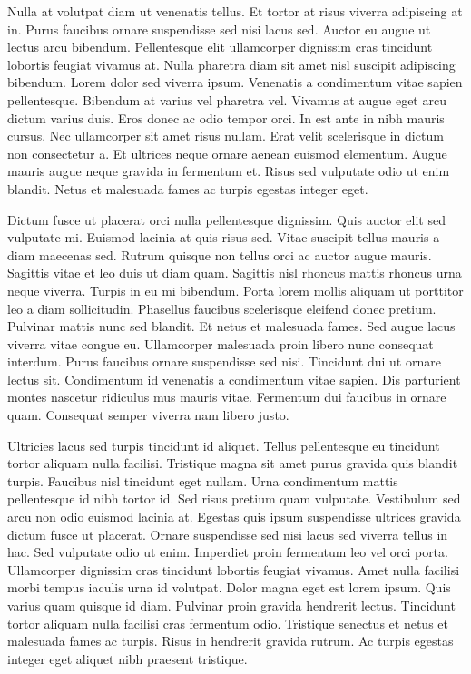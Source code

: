 Nulla at volutpat diam ut venenatis tellus. Et tortor at risus 
viverra adipiscing at in. Purus faucibus ornare suspendisse sed nisi 
lacus sed. Auctor eu augue ut lectus arcu bibendum. Pellentesque elit 
ullamcorper dignissim cras tincidunt lobortis feugiat vivamus at. Nulla 
pharetra diam sit amet nisl suscipit adipiscing bibendum. Lorem dolor 
sed viverra ipsum. Venenatis a condimentum vitae sapien pellentesque. 
Bibendum at varius vel pharetra vel. Vivamus at augue eget arcu dictum 
varius duis. Eros donec ac odio tempor orci. In est ante in nibh mauris 
cursus. Nec ullamcorper sit amet risus nullam. Erat velit scelerisque in
 dictum non consectetur a. Et ultrices neque ornare aenean euismod 
elementum. Augue mauris augue neque gravida in fermentum et. Risus sed 
vulputate odio ut enim blandit. Netus et malesuada fames ac turpis 
egestas integer eget.


Dictum fusce ut placerat orci nulla pellentesque dignissim. Quis 
auctor elit sed vulputate mi. Euismod lacinia at quis risus sed. Vitae 
suscipit tellus mauris a diam maecenas sed. Rutrum quisque non tellus 
orci ac auctor augue mauris. Sagittis vitae et leo duis ut diam quam. 
Sagittis nisl rhoncus mattis rhoncus urna neque viverra. Turpis in eu mi
 bibendum. Porta lorem mollis aliquam ut porttitor leo a diam 
sollicitudin. Phasellus faucibus scelerisque eleifend donec pretium. 
Pulvinar mattis nunc sed blandit. Et netus et malesuada fames. Sed augue
 lacus viverra vitae congue eu. Ullamcorper malesuada proin libero nunc 
consequat interdum. Purus faucibus ornare suspendisse sed nisi. 
Tincidunt dui ut ornare lectus sit. Condimentum id venenatis a 
condimentum vitae sapien. Dis parturient montes nascetur ridiculus mus 
mauris vitae. Fermentum dui faucibus in ornare quam. Consequat semper 
viverra nam libero justo.


Ultricies lacus sed turpis tincidunt id aliquet. Tellus pellentesque 
eu tincidunt tortor aliquam nulla facilisi. Tristique magna sit amet 
purus gravida quis blandit turpis. Faucibus nisl tincidunt eget nullam. 
Urna condimentum mattis pellentesque id nibh tortor id. Sed risus 
pretium quam vulputate. Vestibulum sed arcu non odio euismod lacinia at.
 Egestas quis ipsum suspendisse ultrices gravida dictum fusce ut 
placerat. Ornare suspendisse sed nisi lacus sed viverra tellus in hac. 
Sed vulputate odio ut enim. Imperdiet proin fermentum leo vel orci 
porta. Ullamcorper dignissim cras tincidunt lobortis feugiat vivamus. 
Amet nulla facilisi morbi tempus iaculis urna id volutpat. Dolor magna 
eget est lorem ipsum. Quis varius quam quisque id diam. Pulvinar proin 
gravida hendrerit lectus. Tincidunt tortor aliquam nulla facilisi cras 
fermentum odio. Tristique senectus et netus et malesuada fames ac 
turpis. Risus in hendrerit gravida rutrum. Ac turpis egestas integer 
eget aliquet nibh praesent tristique.


